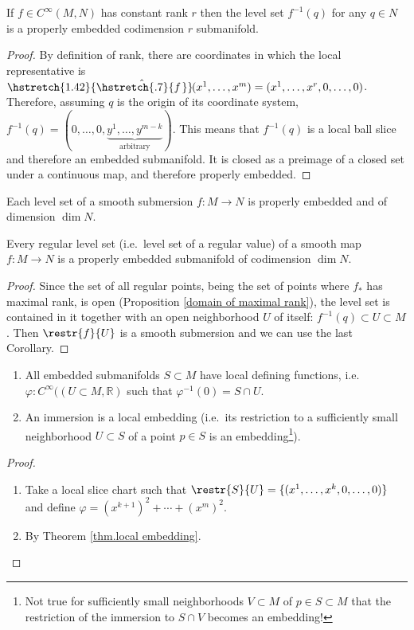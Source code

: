 \documentclass[english,letterpaper]{article}%
\numberwithin{equation}{section}
\numberwithin{figure}{section}
\numberwithin{table}{section}
\theoremstyle{definition}
\theoremstyle{definition}
\theoremstyle{definition}
\theoremstyle{plain}
\theoremstyle{plain}
\theoremstyle{plain}
\theoremstyle{plain}
\theoremstyle{remark}
\theoremstyle{remark}
\newcommand\wh[1]{\hstretch{1.42}{\hat{\hstretch{.7}{#1\mkern2mu}}}\mkern-2mu} %
\begin{document}
\begin{thm}
If $f\in C^\infty(M,N)$ has constant rank $r$ then the level set $f^{-1}(q)$ for any $q\in N$ is a properly embedded codimension $r$ submanifold.
\end{thm}
\begin{proof}
By definition of rank, there are coordinates in which the local representative is $\wh{f}(x^1,\ldots,x^m)=(x^1,\ldots,x^r,0,\ldots,0)$. Therefore, assuming $q$ is the origin of its coordinate system, $f^{-1}(q)=(0,\ldots,0,\underbrace{y^1,\ldots,y^{m-k}}_{\text{arbitrary}})$. This means that $f^{-1}(q)$ is a local ball slice and therefore an embedded submanifold. It is closed as a preimage of a closed set under a continuous map, and therefore properly embedded.
\end{proof}
\begin{cor}
Each level set of a smooth submersion $f:M\to N$ is properly embedded and of dimension $\dim N$.
\end{cor}
\begin{cor}
Every regular level set (i.e.\ level set of a regular value) of a smooth map $f:M\to N$ is a properly embedded submanifold of codimension $\dim N$.
\end{cor}
\begin{proof}
Since the set of all regular points, being the set of points where $f_{\ast}$ has maximal rank, is open (Proposition \ref{domain of maximal rank}), the level set is contained in it together with an open neighborhood $U$ of itself: $f^{-1}(q)\subset U\subset M$. Then $\restr{f}{U}$ is a smooth submersion and we can use the last Corollary.
\end{proof}

\begin{prop}
\begin{enumerate}
    \item All embedded submanifolds $S\subset M$ have local defining functions, i.e.\ $\varphi:C^\infty((U\subset M, \mathbb{R})$ such that $\varphi^{-1}(0)=S\cap U$.
    \item An immersion is a local embedding (i.e.\ its restriction to a sufficiently small neighborhood $U\subset S$ of a point $p\in S$ is an embedding\footnote{Not true for sufficiently small neighborhoods $V\subset M$ of $p\in S\subset M$ that the restriction of the immersion to $S\cap V$ becomes an embedding!}).
\end{enumerate}
\end{prop}
\begin{proof}
\begin{enumerate}
    \item Take a local slice chart such that $\restr{S}{U}=\{(x^1,\ldots,x^k,0,\ldots,0)\}$ and define $\varphi=(x^{k+1})^2+\cdots+(x^m)^2$.
    \item By Theorem \ref{thm.local embedding}.
\end{enumerate}
\end{proof}
\end{document}
